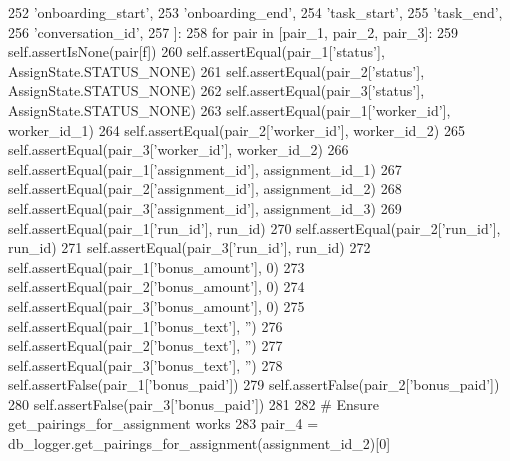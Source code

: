 \begin{DoxyCode}
252             \textcolor{stringliteral}{'onboarding\_start'},
253             \textcolor{stringliteral}{'onboarding\_end'},
254             \textcolor{stringliteral}{'task\_start'},
255             \textcolor{stringliteral}{'task\_end'},
256             \textcolor{stringliteral}{'conversation\_id'},
257         ]:
258             \textcolor{keywordflow}{for} pair \textcolor{keywordflow}{in} [pair\_1, pair\_2, pair\_3]:
259                 self.assertIsNone(pair[f])
260         self.assertEqual(pair\_1[\textcolor{stringliteral}{'status'}], AssignState.STATUS\_NONE)
261         self.assertEqual(pair\_2[\textcolor{stringliteral}{'status'}], AssignState.STATUS\_NONE)
262         self.assertEqual(pair\_3[\textcolor{stringliteral}{'status'}], AssignState.STATUS\_NONE)
263         self.assertEqual(pair\_1[\textcolor{stringliteral}{'worker\_id'}], worker\_id\_1)
264         self.assertEqual(pair\_2[\textcolor{stringliteral}{'worker\_id'}], worker\_id\_2)
265         self.assertEqual(pair\_3[\textcolor{stringliteral}{'worker\_id'}], worker\_id\_2)
266         self.assertEqual(pair\_1[\textcolor{stringliteral}{'assignment\_id'}], assignment\_id\_1)
267         self.assertEqual(pair\_2[\textcolor{stringliteral}{'assignment\_id'}], assignment\_id\_2)
268         self.assertEqual(pair\_3[\textcolor{stringliteral}{'assignment\_id'}], assignment\_id\_3)
269         self.assertEqual(pair\_1[\textcolor{stringliteral}{'run\_id'}], run\_id)
270         self.assertEqual(pair\_2[\textcolor{stringliteral}{'run\_id'}], run\_id)
271         self.assertEqual(pair\_3[\textcolor{stringliteral}{'run\_id'}], run\_id)
272         self.assertEqual(pair\_1[\textcolor{stringliteral}{'bonus\_amount'}], 0)
273         self.assertEqual(pair\_2[\textcolor{stringliteral}{'bonus\_amount'}], 0)
274         self.assertEqual(pair\_3[\textcolor{stringliteral}{'bonus\_amount'}], 0)
275         self.assertEqual(pair\_1[\textcolor{stringliteral}{'bonus\_text'}], \textcolor{stringliteral}{''})
276         self.assertEqual(pair\_2[\textcolor{stringliteral}{'bonus\_text'}], \textcolor{stringliteral}{''})
277         self.assertEqual(pair\_3[\textcolor{stringliteral}{'bonus\_text'}], \textcolor{stringliteral}{''})
278         self.assertFalse(pair\_1[\textcolor{stringliteral}{'bonus\_paid'}])
279         self.assertFalse(pair\_2[\textcolor{stringliteral}{'bonus\_paid'}])
280         self.assertFalse(pair\_3[\textcolor{stringliteral}{'bonus\_paid'}])
281 
282         \textcolor{comment}{# Ensure get\_pairings\_for\_assignment works}
283         pair\_4 = db\_logger.get\_pairings\_for\_assignment(assignment\_id\_2)[0]

\end{DoxyCode}
